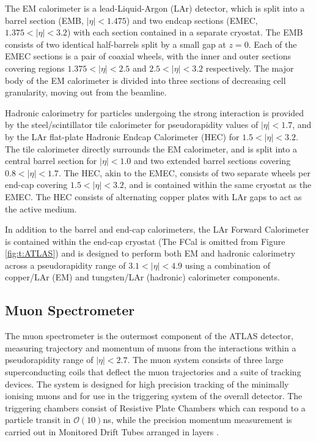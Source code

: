 		The EM calorimeter \cite{larcalo} is a lead-Liquid-Argon (LAr) detector, which is split into a barrel section (EMB, $|\eta|<1.475$) and two endcap sections (EMEC, $1.375<|\eta|<3.2$) with each section contained in a separate cryostat. The EMB consists of two identical half-barrels split by a small gap at $z=0$. Each of the EMEC sections is a pair of coaxial wheels, with the inner and outer sections covering regions $1.375<|\eta|<2.5$ and $2.5<|\eta|<3.2$ respectively. The major body of the EM calorimeter is divided into three sections of decreasing cell granularity, moving out from the beamline.

		Hadronic calorimetry for particles undergoing the strong interaction is provided by the steel/scintillator tile calorimeter \cite{atlastile} for pseudorapidity values of $|\eta|<1.7$, and by the LAr flat-plate Hadronic Endcap Calorimeter (HEC) for $1.5<|\eta|<3.2$. The tile calorimeter directly surrounds the EM calorimeter, and is split into a central barrel section for $|\eta| < 1.0$ and two extended barrel sections covering $0.8<|\eta|<1.7$. The HEC, akin to the EMEC, consists of two separate wheels per end-cap covering $1.5<|\eta|<3.2$, and is contained within the same cryostat as the EMEC. The HEC consists of alternating copper plates with LAr gaps to act as the active medium.

		In addition to the barrel and end-cap calorimeters, the LAr Forward Calorimeter \cite{forwardcal} is contained within the end-cap cryostat (The FCal is omitted from Figure \ref{fig:t:ATLAS}) and is designed to perform both EM and hadronic calorimetry across a pseudorapidity range of $3.1<|\eta|<4.9$ using a combination of copper/LAr (EM) and tungsten/LAr (hadronic) calorimeter components.

	\subsection{Muon Spectrometer}

		The muon spectrometer is the outermost component of the ATLAS detector, measuring trajectory and momentum of muons from the interactions within a pseudorapidity range of $|\eta| < 2.7$. The muon system consists of three large superconducting coils that deflect the muon trajectories and a suite of tracking devices. The system is designed for high precision tracking of the minimally ionising muons and for use in the triggering system of the overall detector. The triggering chambers consist of Resistive Plate Chambers which can respond to a particle transit in $\mathcal{O}(10)$ns, while the precision momentum measurement is carried out in Monitored Drift Tubes arranged in layers \cite{ATLAS}.


